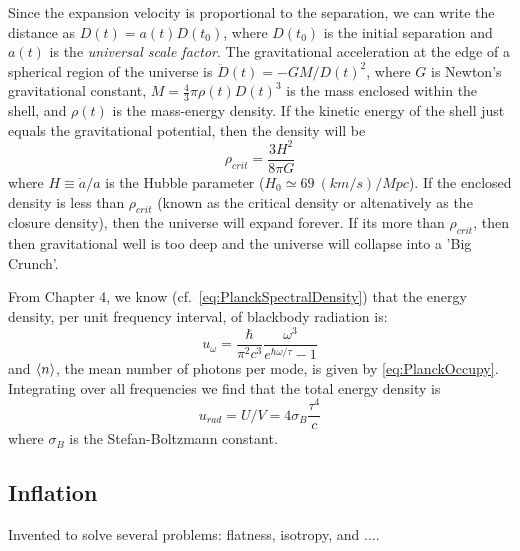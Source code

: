Since the expansion velocity is proportional to the separation, we 
can write the distance as $D(t) = a(t) D(t_0)$, where $D(t_0)$ is 
the initial separation and $a(t)$ is the \textit{universal scale factor}.
The gravitational acceleration at the edge of a spherical region of
the universe is $\ddot{D}(t) = -G M / D(t)^2$, where $G$ is Newton's gravitational constant, $M = \frac{4}{3} \pi \rho(t) D(t)^3$ is the mass enclosed within the shell, and $\rho(t)$ is the mass-energy density. If the kinetic energy of the shell just equals the gravitational potential, then the density will be
\begin{equation}
\rho_{crit} = \frac{3 H^2}{8 \pi G}
\label{eq:CriticalDensity}
\end{equation}
where $H \equiv \dot{a}/a$ is the Hubble parameter ($H_0 \simeq 69~(km/s)/Mpc$). If the enclosed density is less than $\rho_{crit}$ (known as the critical density or altenatively as the closure density), then the universe will expand forever. If its more than $\rho_{crit}$, then then gravitational well is too deep and the universe will collapse into a 'Big Crunch'.

From Chapter 4, we know (cf.~\cref{eq:PlanckSpectralDensity}) that the energy density, per unit frequency interval, of blackbody radiation is:
\begin{equation}
u_{\omega} = \frac{\hbar}{\pi^2 c^3} \frac{\omega^3}{e^{\hbar \omega/\tau} - 1}
\end{equation}
and $\Braket{n}$, the mean number of photons per mode, is given by \cref{eq:PlanckOccupy}. Integrating over all frequencies we find that the total energy density is
\begin{equation}
u_{rad} = U/V = 4 \sigma_B \frac{\tau^4}{c}
\end{equation}
where $\sigma_B$ is the Stefan-Boltzmann constant. 







\subsection{Inflation}
Invented to solve several problems: flatness, isotropy, and ....



